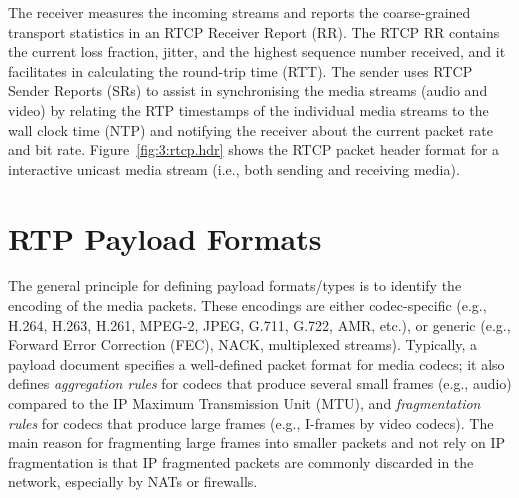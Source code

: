 
The receiver measures the incoming streams and reports the coarse-grained
transport statistics in an RTCP Receiver Report (RR). The RTCP RR contains the
current loss fraction, jitter, and the highest sequence number received, and it
facilitates in calculating the round-trip time (RTT). The sender uses RTCP Sender Reports (SRs)
to assist in synchronising the media streams (audio and video) by relating the
RTP timestamps of the individual media streams to the wall clock time (NTP)
and notifying the receiver about the current packet rate and bit rate.
Figure~\ref{fig:3:rtcp.hdr} shows the RTCP packet header format for a
interactive unicast media stream (i.e., both sending and receiving media).

\section{RTP Payload Formats}

The general principle for defining payload formats/types is to
identify the encoding of the media packets. These encodings are either
codec-specific (e.g., H.264, H.263, H.261, MPEG-2, JPEG, G.711, G.722, AMR, etc.),
or generic (e.g., Forward Error Correction (FEC), NACK, multiplexed streams).
Typically, a payload document specifies a well-defined packet format for media
codecs; it also defines \emph{aggregation rules} for codecs that produce
several small frames (e.g., audio) compared to the IP Maximum Transmission
Unit (MTU), and \emph{fragmentation rules} for codecs that produce large frames
(e.g., I-frames by video codecs). The main reason for fragmenting large
frames into smaller packets and not rely on IP fragmentation is that IP
fragmented packets are commonly discarded in the network, especially by NATs
or firewalls.


